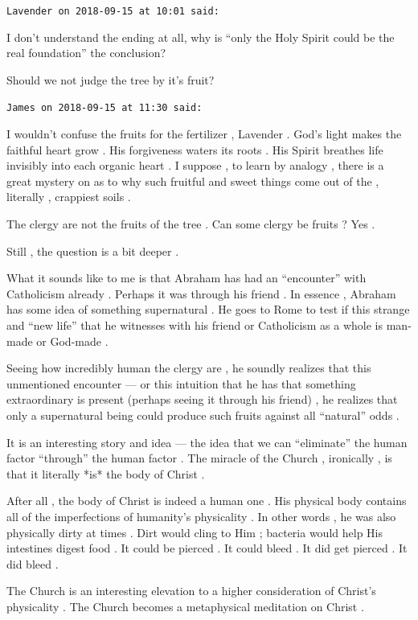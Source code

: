 \begin{footnotesize}
\begin{sffamily}
\texttt{Lavender on 2018-09-15 at 10:01 said:}

I don't understand the ending at all, why is ``only the Holy Spirit could be the real foundation'' the conclusion?

Should we not judge the tree by it's fruit?

\hfill

\texttt{James on 2018-09-15 at 11:30 said:}

I wouldn't confuse the fruits for the fertilizer , Lavender . God's light makes the faithful heart grow . His forgiveness waters its roots . His Spirit breathes life invisibly into each organic heart . I suppose , to learn by analogy , there is a great mystery on as to why such fruitful and sweet things come out of the , literally , crappiest soils .

The clergy are not the fruits of the tree . Can some clergy be fruits ? Yes .

Still , the question is a bit deeper .

What it sounds like to me is that Abraham has had an ``encounter'' with Catholicism already . Perhaps it was through his friend . In essence , Abraham has some idea of something supernatural . He goes to Rome to test if this strange and ``new life'' that he witnesses with his friend or Catholicism as a whole is man-made or God-made .

Seeing how incredibly human the clergy are , he soundly realizes that this unmentioned encounter --- or this intuition that he has that something extraordinary is present (perhaps seeing it through his friend) , he realizes that only a supernatural being could produce such fruits against all ``natural'' odds .

It is an interesting story and idea --- the idea that we can ``eliminate'' the human factor ``through'' the human factor . The miracle of the Church , ironically , is that it literally *is* the body of Christ .

After all , the body of Christ is indeed a human one . His physical body contains all of the imperfections of humanity's physicality . In other words , he was also physically dirty at times . Dirt would cling to Him ; bacteria would help His intestines digest food . It could be pierced . It could bleed . It did get pierced . It did bleed .

The Church is an interesting elevation to a higher consideration of Christ's physicality . The Church becomes a metaphysical meditation on Christ .


\end{sffamily}
\end{footnotesize}
